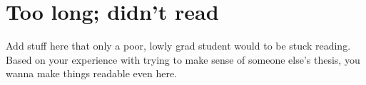 \cleardoublepage
\chapter{Too long; didn't read}
\label{Appendix:tldr1}

  Add stuff here that only a poor, lowly grad student would to be stuck reading.
  Based on your experience with trying to make sense of someone else's thesis, you wanna make
  things readable even here.

